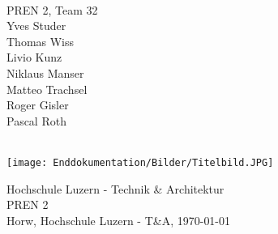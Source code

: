 \begin{titlepage}
    \begin{center}
        \parindent0pt{\Huge\bfseries \myDokumentTyp}\\[0.5cm]
        {\huge PREN 2, Team 32}\\[1cm]
        Yves Studer\\
        Thomas Wiss\\
        Livio Kunz\\
        Niklaus Manser\\
        Matteo Trachsel\\
        Roger Gisler\\
        Pascal Roth\\
        \vspace*{1cm}
        {\Huge \myTitel}\\[0.5cm]
        \begin{figure*}[h!]
            \centering
            \texttt{[image: Enddokumentation/Bilder/Titelbild.JPG]}
        \end{figure*}
        
        \vfill{}
        {\normalsize Hochschule Luzern - Technik \& Architektur\\
         PREN 2}\\[0.6cm]
        {\normalsize Horw, Hochschule Luzern - T\&A, \today}
    \end{center}
\end{titlepage}
